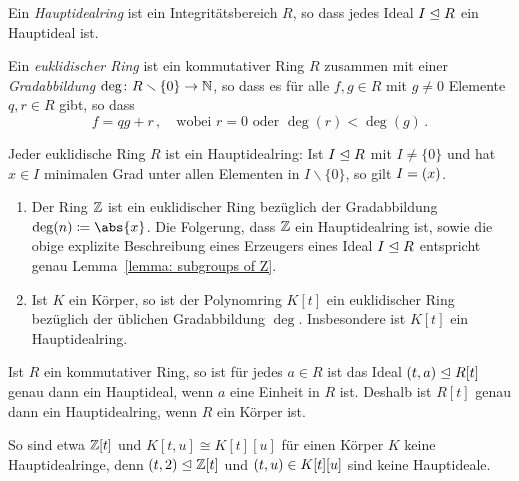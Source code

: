\begin{definition}
  Ein \emph{Hauptidealring} ist ein Integritätsbereich $R$, so dass jedes Ideal $I \mathrel{\trianglelefteq} R$ ein Hauptideal ist.
\end{definition}

\begin{definition}
  Ein \emph{euklidischer Ring} ist ein kommutativer Ring $R$ zusammen mit einer \emph{Gradabbildung} $\deg \colon R \smallsetminus \{0\} \to \mathbb{N}$, so dass es für alle $f, g \in R$ mit $g \neq 0$ Elemente $q, r \in R$ gibt, so dass
  \[
    f = qg + r \,,
    \quad
    \text{wobei $r = 0$ oder $\deg(r) < \deg(g)$} \,.
  \]
\end{definition}

\begin{lemma}
  Jeder euklidische Ring $R$ ist ein Hauptidealring:
  Ist $I \mathrel{\trianglelefteq} R$ mit $I \neq \{0\}$ und hat $x \in I$ minimalen Grad unter allen Elementen in $I \smallsetminus \{0\}$, so gilt $I = (x)$.
\end{lemma}

\begin{example}
  \begin{enumerate}
    \item
      Der Ring $\mathbb{Z}$ ist ein euklidischer Ring bezüglich der Gradabbildung $\deg(n) \defined \abs{x}$.
      Die Folgerung, dass $\mathbb{Z}$ ein Hauptidealring ist, sowie die obige explizite Beschreibung eines Erzeugers eines Ideal $I \mathrel{\trianglelefteq} R$ entspricht genau Lemma~\ref{lemma: subgroups of Z}.
    \item
      Ist $K$ ein Körper, so ist der Polynomring $K[t]$ ein euklidischer Ring bezüglich der üblichen Gradabbildung $\deg$.
      Insbesondere ist $K[t]$ ein Hauptidealring.
  \end{enumerate}
\end{example}

\begin{remark}
  Ist $R$ ein kommutativer Ring, so ist für jedes $a \in R$ ist das Ideal $(t, a) \mathrel{\trianglelefteq} R[t]$ genau dann ein Hauptideal, wenn $a$ eine Einheit in $R$ ist.
  Deshalb ist $R[t]$ genau dann ein Hauptidealring, wenn $R$ ein Körper ist.
  
  So sind etwa $\mathbb{Z}[t]$ und $K[t,u] \cong K[t][u]$ für einen Körper $K$ keine Hauptidealringe, denn $(t, 2) \mathrel{\trianglelefteq} \mathbb{Z}[t]$ und $(t, u) \in K[t][u]$ sind keine Hauptideale.
\end{remark}

